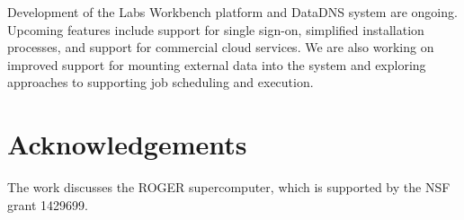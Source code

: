 \documentclass{sig-alternate}
\begin{document}
Development of the Labs Workbench platform and DataDNS system are ongoing.  Upcoming features include support for single sign-on, simplified installation processes, and support for commercial cloud services. We are also working on improved support for mounting external data into the system and exploring approaches to supporting job scheduling and execution.

\section{Acknowledgements}
The work discusses the ROGER supercomputer, which is supported by the NSF grant 1429699. 


  
\end{document}
